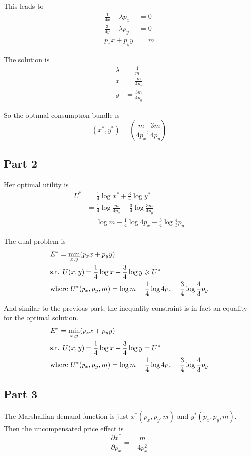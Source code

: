 \documentclass{article}
\begin{document}
This leads to
\begin{align*}
	\frac{1}{4x}-\lambda p_x&=0\\
	\frac{3}{4y}-\lambda p_y&=0\\
	p_xx+p_yy&=m
\end{align*}

The solution is
\begin{align*}
	\lambda&=\frac{1}{m}\\
	x&=\frac{m}{4p_x}\\
	y&=\frac{3m}{4p_y}
\end{align*}

So the optimal consumption bundle is
\begin{equation*}
	(x^*,y^*)=\left(\frac{m}{4p_x},\frac{3m}{4p_y}\right)
\end{equation*}

\subsection{Part 2}
Her optimal utility is
\begin{align*}
	U^*&=\frac{1}{4}\log x^*+\frac{3}{4}\log y^*\\
	&=\frac{1}{4}\log\frac{m}{4p_x}+\frac{3}{4}\log\frac{3m}{4p_y}\\
	&=\log m-\frac{1}{4}\log 4p_x-\frac{3}{4}\log\frac{4}{3}p_y
\end{align*}

The dual problem is
\begin{align*}
	&E^*=\min_{x,y}(p_xx+p_yy)\\
	&\textup{s.t. }U(x,y)=\frac{1}{4}\log x+\frac{3}{4}\log y\geqslant U^*\\
	&\textup{where }U^*(p_x,p_y,m)=\log m-\frac{1}{4}\log 4p_x-\frac{3}{4}\log\frac{4}{3}p_y
\end{align*}

And similar to the previous part, the inequality constraint is in fact an equality for the optimal solution. 
\begin{align*}
	&E^*=\min_{x,y}(p_xx+p_yy)\\
	&\textup{s.t. }U(x,y)=\frac{1}{4}\log x+\frac{3}{4}\log y=U^*\\
	&\textup{where }U^*(p_x,p_y,m)=\log m-\frac{1}{4}\log 4p_x-\frac{3}{4}\log\frac{4}{3}p_y
\end{align*}

\subsection{Part 3}
The Marshallian demand function is just $x^*(p_x,p_y,m)$ and $y^*(p_x,p_y,m)$. Then the uncompensated price effect is
\begin{equation*}
	\frac{\partial x^*}{\partial p_x}=-\frac{m}{4p_x^2}
\end{equation*}
\end{document}
